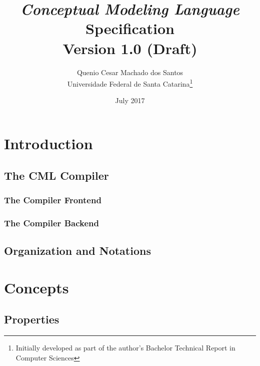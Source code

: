 \documentclass[a4paper,oneside,12pt, extrafontsizes]{memoir}
\title{\emph{Conceptual Modeling Language}\\Specification\\ \small{Version 1.0 (Draft)}}
\author{Quenio Cesar Machado dos Santos\\
\small{Universidade Federal de Santa Catarina}\thanks{
Initially developed as part of the author's Bachelor Technical Report in Computer Sciences}}
\date{July 2017}
\theoremstyle{definition}
\theoremstyle{definition}
\theoremstyle{definition}
\theoremstyle{definition}
\theoremstyle{definition}
\begin{document}
\begin{titlingpage}
\maketitle
\end{titlingpage}

\frontmatter

\begin{KeepFromToc}

\clearpage
\tableofcontents

\clearpage
\listoffigures

\clearpage
\listoftables

\end{KeepFromToc}

\mainmatter

\chapter{Introduction}


\section{The CML Compiler}
\label{sec:compiler}


\subsection[Frontend]{The Compiler Frontend}
\label{subsec:frontend}


\subsection[Backend]{The Compiler Backend}
\label{subsec:backend}


\section{Organization and Notations}
\label{sec:org}


\chapter{Concepts}
\label{ch:concepts}


\section{Properties}
\label{sec:properties}

\end{document}
